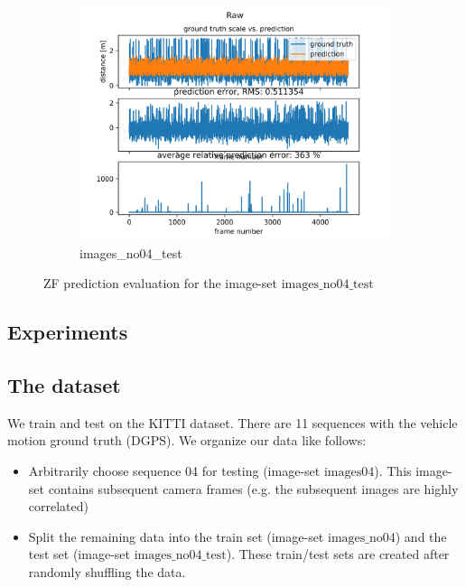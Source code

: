 \documentclass{article}
\begin{document}
\begin{figure}[h!]
	\begin{subfigure}{.5\textwidth}
		\includegraphics[width=\linewidth]{images_no04_test_ZF_raw}
		\caption{images\_no04\_test}
		\label{fig:ZF_images_no04_test_raw}
	\end{subfigure}
	\caption{ZF prediction evaluation for the image-set $\mathrm{images\_no04\_test}$}
	\label{fig:ZF_results_images_no04_test}
\end{figure}

\subsection{Experiments}
\subsection{The dataset}

We train and test on the KITTI dataset. There are 11 sequences with
the vehicle motion ground truth (DGPS).  We organize our data like follows:

\begin{itemize}
	\item Arbitrarily choose sequence 04 for testing (image-set $\mathrm{images04}$).  This image-set contains subsequent camera frames (e.g. the subsequent images are highly correlated)
	\item Split the remaining data into the train set (image-set $\mathrm{images\_no04}$) and the test set (image-set $\mathrm{images\_no04\_test}$).  These train/test sets are created after randomly shuffling the data.
\end{itemize}
\end{document}

